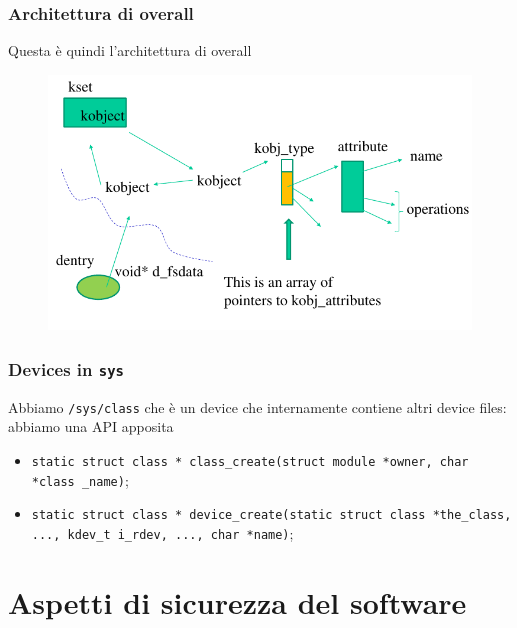 \documentclass[12pt, oneside]{extbook}
\begin{document}
\subsection{Architettura di overall}
Questa è quindi l'architettura di overall
\begin{figure}[!h]
	\includegraphics[scale=0.5]{immagini/sys_overall.png}
\end{figure}
\subsection{Devices in \texttt{sys}}
Abbiamo \texttt{/sys/class} che è un device che internamente contiene altri device files: abbiamo una API apposita
\begin{itemize}
	\item \texttt{static struct class * class\_create(struct module *owner, char *class	\_name)};
	\item \texttt{static struct class * device\_create(static struct class *the\_class, ..., kdev\_t i\_rdev, ..., char *name)};
\end{itemize}
\chapter{Aspetti di sicurezza del software}
\end{document}
